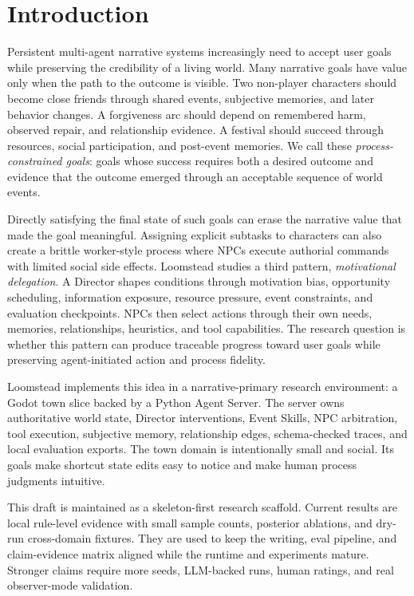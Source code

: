 \section{Introduction}

Persistent multi-agent narrative systems increasingly need to accept user goals while preserving the credibility of a living world. Many narrative goals have value only when the path to the outcome is visible. Two non-player characters should become close friends through shared events, subjective memories, and later behavior changes. A forgiveness arc should depend on remembered harm, observed repair, and relationship evidence. A festival should succeed through resources, social participation, and post-event memories. We call these \emph{process-constrained goals}: goals whose success requires both a desired outcome and evidence that the outcome emerged through an acceptable sequence of world events.

Directly satisfying the final state of such goals can erase the narrative value that made the goal meaningful. Assigning explicit subtasks to characters can also create a brittle worker-style process where NPCs execute authorial commands with limited social side effects. Loomstead studies a third pattern, \emph{motivational delegation}. A Director shapes conditions through motivation bias, opportunity scheduling, information exposure, resource pressure, event constraints, and evaluation checkpoints. NPCs then select actions through their own needs, memories, relationships, heuristics, and tool capabilities. The research question is whether this pattern can produce traceable progress toward user goals while preserving agent-initiated action and process fidelity.

Loomstead implements this idea in a narrative-primary research environment: a Godot town slice backed by a Python Agent Server. The server owns authoritative world state, Director interventions, Event Skills, NPC arbitration, tool execution, subjective memory, relationship edges, schema-checked traces, and local evaluation exports. The town domain is intentionally small and social. Its goals make shortcut state edits easy to notice and make human process judgments intuitive.

This draft is maintained as a skeleton-first research scaffold. Current results are local rule-level evidence with small sample counts, posterior ablations, and dry-run cross-domain fixtures. They are used to keep the writing, eval pipeline, and claim-evidence matrix aligned while the runtime and experiments mature. Stronger claims require more seeds, LLM-backed runs, human ratings, and real observer-mode validation.

